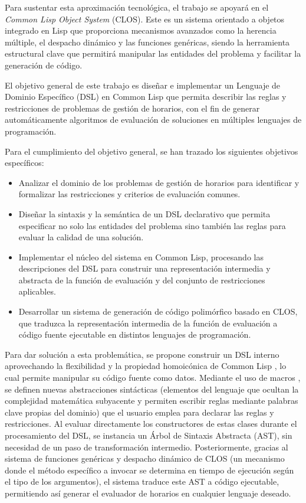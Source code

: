 \documentclass[12pt]{article}
\begin{document}
Para sustentar esta aproximación tecnológica, el trabajo se apoyará en el \textit{Common Lisp Object System} (CLOS). Este es un sistema orientado a objetos integrado en Lisp que proporciona mecanismos avanzados como la herencia múltiple, el despacho dinámico y las funciones genéricas, siendo la herramienta estructural clave que permitirá manipular las entidades del problema y facilitar la generación de código. 

El objetivo general de este trabajo es diseñar e implementar un Lenguaje de Dominio Específico (DSL) en Common Lisp que permita describir las reglas y restricciones de problemas de gestión de horarios, con el fin de generar automáticamente algoritmos de evaluación de soluciones en múltiples lenguajes de programación.

Para el cumplimiento del objetivo general, se han trazado los siguientes objetivos específicos:

\begin{itemize}
\item Analizar el dominio de los problemas de gestión de horarios para identificar y formalizar las restricciones y criterios de evaluación comunes.

\item Diseñar la sintaxis y la semántica de un DSL declarativo que permita especificar no solo las entidades del problema sino también las reglas para evaluar la calidad de una solución.

\item Implementar el núcleo del sistema en Common Lisp, procesando las descripciones del DSL para construir una representación intermedia y abstracta de la función de evaluación y del conjunto de restricciones aplicables.

\item Desarrollar un sistema de generación de código polimórfico basado en CLOS, que traduzca la representación intermedia de la función de evaluación a código fuente ejecutable en distintos lenguajes de programación.
\end{itemize}

Para dar solución a esta problemática, se propone construir un DSL interno aprovechando la flexibilidad y la propiedad homoicónica de Common Lisp \cite{steele1990}, lo cual permite manipular su código fuente como datos. Mediante el uso de macros \cite{norvig1992}, se definen nuevas abstracciones sintácticas (elementos del lenguaje que ocultan la complejidad matemática subyacente y permiten escribir reglas mediante palabras clave propias del dominio) que el usuario emplea para declarar las reglas y restricciones. Al evaluar directamente los constructores de estas clases durante el procesamiento del DSL, se instancia un Árbol de Sintaxis Abstracta (AST), sin necesidad de un paso de transformación intermedio. Posteriormente, gracias al sistema de funciones genéricas y despacho dinámico de CLOS (un mecanismo donde el método específico a invocar se determina en tiempo de ejecución según el tipo de los argumentos), el sistema traduce este AST a código ejecutable, permitiendo así generar el evaluador de horarios en cualquier lenguaje deseado.\\
\end{document}
